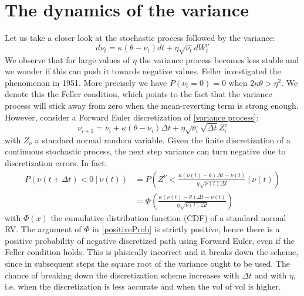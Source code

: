 \documentclass[12pt]{article}
\numberwithin{equation}{section}
\begin{document}
\section{The dynamics of the variance}
Let us take a closer look at the stochastic process followed by the variance:
\begin{equation}\label{variance process}
d\nu_t = \kappa(\theta - \nu_t)dt + \eta\sqrt{\nu_t}dW_t^\nu
\end{equation}
We observe that for large values of $\eta$ the variance process becomes less stable and we wonder if this can push it towards negative values. Feller investigated the phenomenon in 1951. More precisely we have $P(\nu_t = 0) = 0$ when $2\kappa\theta > \eta^2$. We denote this the Feller condition, which points to the fact that the variance process will stick away from zero when the mean-reverting term is strong enough. \\
\newline
However, consider a Forward Euler discretization of \ref{variance process}:
\begin{equation}\label{ForwardEuler}
\nu_{i+1} = \nu_{i} + \kappa(\theta - \nu_{i})\Delta t + \eta\sqrt{\nu_{i}}\sqrt{\Delta t}Z_i^\nu
\end{equation}
with $Z_\nu$ a standard normal random variable. Given the finite discretization of a continuous stochastic process, the next step variance can turn negative due to discretization errors. In fact:
\begin{equation} \label{positiveProb}
	\begin{aligned}
	P(\nu(t+ \Delta t)<0 \ | \ \nu(t)) &= P \left ( Z^\nu < \frac{\kappa(\nu(t) - \theta)\Delta t - \nu(t)}{\eta\sqrt{\nu(t)\Delta t}} \ \Bigg| \ \nu(t) 	\right ) \\
	&= \Phi \left ( \frac{\kappa(\nu(t) - \theta)\Delta t - \nu(t)}{\eta\sqrt{\nu(t)\Delta t}} \right )
	\end{aligned}
\end{equation}
with $\Phi(x)$ the cumulative distribution function (CDF) of a standard normal RV. The argument of $\Phi$ in \ref{positiveProb} is strictly positive, hence there is a positive probability of negative discretized path using Forward Euler, even if the Feller condition holds. This is phisically incorrect and it breaks down the scheme, since in subsequent steps the square root of the variance ought to be used. The chance of breaking down the discretization scheme increases with $\Delta t$ and with $\eta$, i.e. when the discretization is less accurate and when the vol of vol is higher.
\end{document}
